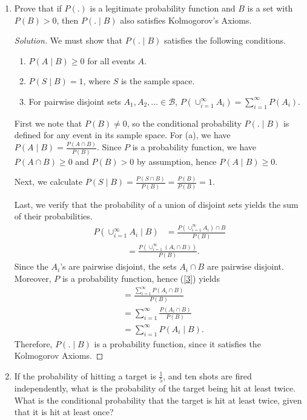 \documentclass[12pt]{article}
\theoremstyle{definition}
\theoremstyle{plain}
\newenvironment{solution}
  {\begin{proof}[Solution]}
  {\end{proof}}
\begin{document}
\begin{enumerate}
\item Prove that if $ P(.)$ is a legitimate probability function and $ B $ is a set with $ P(B) > 0 $, then $ P(. \mid B) $ also satisfies Kolmogorov's Axioms.
\begin{solution}
	We must show that $ P(. \mid B) $ satisfies the following conditions.
	\begin{enumerate}
	\item $ P(A \mid B) \geq 0 $ for all events $ A $.
	\item $ P(S \mid B) = 1 $, where $ S $ is the sample space.
	\item For pairwise disjoint sets $ A_1, A_2, \ldots \in \mathcal{B} $, $ P(\cup_{i=1}^\infty A_i) = \sum_{i=1}^\infty P(A_i) $.
	\end{enumerate}
	
	First we note that $ P(B) \neq 0 $, so the conditional probability $ P(. \mid B) $ is defined for any event in its sample space. For (a), we have $ P(A \mid B) = \frac{P(A \cap B)}{P(B)} $. Since $ P $ is a probability function, we have $ P(A \cap B) \geq 0 $ and $ P(B) > 0$ by assumption, hence $ P(A \mid B) \geq 0 $.
	
	Next, we calculate $ P(S \mid B) = \frac{P(S \cap B)}{P(B)} = \frac{P(B)}{P(B)} = 1$.
	
	Last, we verify that the probability of a union of disjoint sets yields the sum of their probabilities.
	\begin{align*}
		P(\cup_{i=1}^\infty A_i \mid B) &= \frac{ P(\cup_{i=1}^\infty A_i) \cap B}{P(B)}
	\end{align*}
	\begin{align}
		\label{3} &= \frac{ P(\cup_{i=1}^\infty (A_i \cap B)) }{P(B)}.
	\end{align}
	Since the $ A_i $'s are pairwise disjoint, the sets $ A_i\cap B $ are pairwise disjoint. Moreover, $ P $ is a probability function, hence (\ref{3}) yields
	\begin{align*}
		&= \frac{ \sum_{i=1}^\infty P(A_i \cap B) }{P(B)}\\
		&= \sum_{i=1}^\infty \frac{P(A_i \cap B)}{P(B)}\\
		&= \sum_{i=1}^\infty P(A_i \mid B).
	\end{align*}
	Therefore, $ P(. \mid B) $ is a probability function, since it satisfies the Kolmogorov Axioms.
\end{solution}

\item If the probability of hitting a target is $ \frac{1}{5} $, and ten shots are fired independently, what is the probability of the target being hit at least twice. What is the conditional probability that the target is hit at least twice, given that it is hit at least once?


\end{enumerate}
\end{document}
